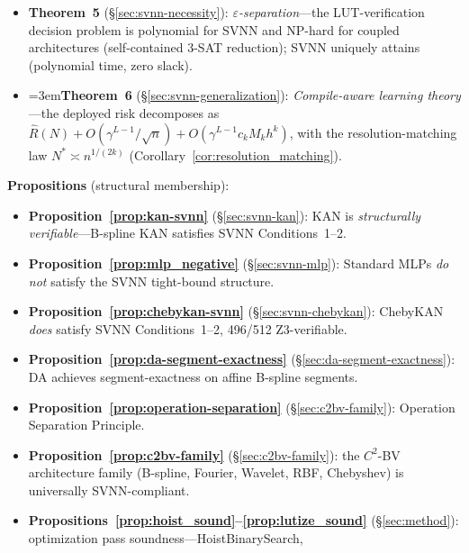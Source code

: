 \begin{remark}
\begin{itemize}
          and Non-Interference (E)---completing the theoretical framework.
    \item \textbf{Theorem~5} ({\S}\ref{sec:svnn-necessity}):
          \textit{$\varepsilon$-separation}---the LUT-verification decision
          problem is polynomial for SVNN and NP-hard for coupled
          architectures (self-contained 3-SAT reduction); SVNN uniquely
          attains (polynomial time, zero slack).
    \item \begingroup{}\emergencystretch=3em\textbf{Theorem~6} ({\S}\ref{sec:svnn-generalization}):
          \textit{Compile-aware learning theory}---the deployed risk
          decomposes as $\hat{R}(N) + O(\gamma^{L-1}/\sqrt{n}) +
          O(\gamma^{L-1}c_kM_kh^k)$, with the resolution-matching law
          $N^{*} \asymp n^{1/(2k)}$\allowbreak{} (Corollary~\ref{cor:resolution_matching}).\par\endgroup
\end{itemize}
\noindent\textbf{Propositions} (structural membership):
\begin{itemize}
    \item \textbf{Proposition~\ref{prop:kan-svnn}} ({\S}\ref{sec:svnn-kan}):
          KAN is \textit{structurally verifiable}---B-spline KAN
          satisfies SVNN Conditions~1--2.
    \item \textbf{Proposition~\ref{prop:mlp_negative}} ({\S}\ref{sec:svnn-mlp}):
          Standard MLPs \textit{do not} satisfy the SVNN tight-bound
          structure.
    \item \textbf{Proposition~\ref{prop:chebykan-svnn}} ({\S}\ref{sec:svnn-chebykan}):
          ChebyKAN \textit{does} satisfy SVNN Conditions~1--2, 496/512
          Z3-verifiable.
    \item \textbf{Proposition~\ref{prop:da-segment-exactness}} ({\S}\ref{sec:da-segment-exactness}):
          DA achieves segment-exactness on affine B-spline segments.
    \item \textbf{Proposition~\ref{prop:operation-separation}} ({\S}\ref{sec:c2bv-family}):
          Operation Separation Principle.
    \item \textbf{Proposition~\ref{prop:c2bv-family}} ({\S}\ref{sec:c2bv-family}):
          the $C^2$-BV architecture family (B-spline, Fourier, Wavelet,
          RBF, Chebyshev) is universally SVNN-compliant.
    \item \textbf{Propositions~\ref{prop:hoist_sound}--\ref{prop:lutize_sound}} ({\S}\ref{sec:method}):
          optimization pass soundness---HoistBinarySearch,

\end{itemize}
\end{remark}
